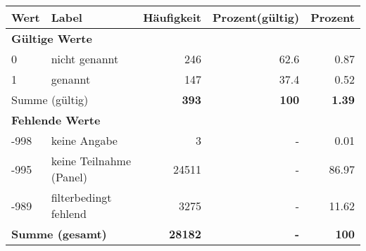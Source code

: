      \begin{longtable}{lXrrr}
     \toprule
     \textbf{Wert} & \textbf{Label} & \textbf{Häufigkeit} & \textbf{Prozent(gültig)} & \textbf{Prozent} \\
     \endhead
     \midrule
     \multicolumn{5}{l}{\textbf{Gültige Werte}}\\

     0 &
     \multicolumn{1}{X}{ nicht genannt   } &


       \num{246} &
       \num[round-mode=places,round-precision=2]{62.6} &
         \num[round-mode=places,round-precision=2]{0.87} \\

     1 &
     \multicolumn{1}{X}{ genannt   } &


       \num{147} &
       \num[round-mode=places,round-precision=2]{37.4} &
         \num[round-mode=places,round-precision=2]{0.52} \\
     \midrule
     \multicolumn{2}{l}{Summe (gültig)} &
       \textbf{\num{393}} &
     \textbf{100} &
       \textbf{\num[round-mode=places,round-precision=2]{1.39}} \\
     \multicolumn{5}{l}{\textbf{Fehlende Werte}}\\
       -998 &
       keine Angabe &
         \num{3} &
        - &
         \num[round-mode=places,round-precision=2]{0.01} \\
       -995 &
       keine Teilnahme (Panel) &
         \num{24511} &
        - &
         \num[round-mode=places,round-precision=2]{86.97} \\
       -989 &
       filterbedingt fehlend &
         \num{3275} &
        - &
         \num[round-mode=places,round-precision=2]{11.62} \\
     \midrule
     \multicolumn{2}{l}{\textbf{Summe (gesamt)}} &
          \textbf{\num{28182}} &
        \textbf{-} &
        \textbf{100} \\
     \bottomrule
     \end{longtable}
     
